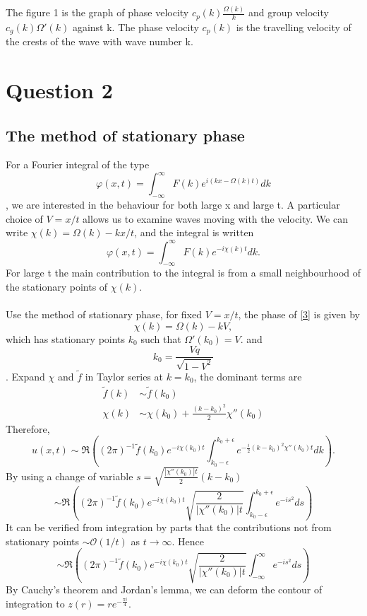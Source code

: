 \documentclass[a4paper,11pt]{article}
\begin{document}
The figure 1 is the graph of phase velocity $c_p (k)\frac{\Omega(k)}{k}$ and group velocity $c_g (k)\Omega'(k)$ against k. The phase velocity $c_p (k)$ is the travelling velocity of the crests of the wave with wave number k. 
\section{Question 2}
\subsection*{The method of stationary phase}
For a Fourier integral of the type $$\varphi (x,t) = \int_{-\infty}^{\infty}F(k)e^{i(kx-\Omega(k)t)}dk$$, we are interested in the behaviour for both large x and large t. A particular choice of $V = x/t$ allows us to examine waves moving with the velocity. We can write $\chi(k) = \Omega(k) - kx/t$, and the integral is written $$\varphi (x,t) = \int_{-\infty}^{\infty}F(k)e^{-i\chi(k)t}dk.$$ For large t the main contribution to the integral is from a small neighbourhood of the stationary points of $\chi(k)$. 
\\
\\
Use the method of stationary phase, for fixed $V = x/t$, the phase of \ref{3} is given by $$\chi(k) = \Omega(k) - kV,$$ which has stationary points $k_0$ such that $ \Omega'(k_0) = V.$ and $$k_0 = \frac{Vq}{\sqrt{1-V^2}}$$.
Expand $\chi$ and $\tilde{f}$ in Taylor series at $k = k_0$, the dominant terms are
\begin{align*}
\tilde{f}(k) &\sim \tilde{f}(k_0)\\
\chi(k) &\sim \chi(k_0) + \frac{(k-k_0)^2}{2} \chi''(k_0)
\end{align*}
Therefore, 
$$
u(x,t) \sim \Re \left((2\pi)^{-1}\tilde{f}(k_0)e^{-i\chi(k_0)t}\int_{k_0-\epsilon}^{k_0+\epsilon} e^{-\frac{i}{2} (k-k_0)^2 \chi''(k_0)t}dk\right). 
$$
By using a change of variable $s = \sqrt{\frac{|\chi''(k_0)|t}{2}}(k-k_0)$
$$
 \sim \Re\left((2\pi)^{-1}\tilde{f}(k_0)e^{-i\chi(k_0)t}\sqrt{\frac{2}{|\chi''(k_0)|t}}\int_{k_0-\epsilon}^{k_0+\epsilon} e^{-is^2}ds\right) 
$$
It can be verified from integration by parts that the contributions not from
 stationary points $\sim \mathcal{O}(1/t)$ as $t\to \infty$. Hence
$$
 \sim \Re\left((2\pi)^{-1}\tilde{f}(k_0)e^{-i\chi(k_0)t}\sqrt{\frac{2}{|\chi''(k_0)|t}}\int_{-\infty}^{\infty} e^{-is^2}ds\right) 
$$
By Cauchy's theorem and Jordan's lemma, we can deform the contour of integration to $z(r) = re^{-\frac{\pi i}{4}}$. \\
\end{document}
